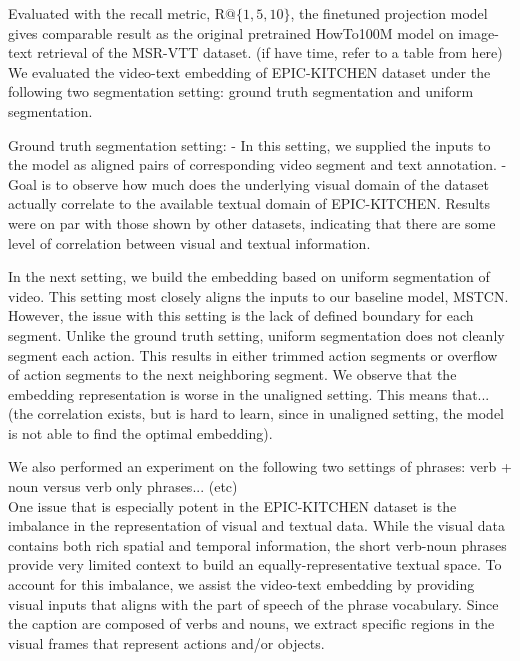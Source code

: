 Evaluated with the recall metric, R$@\{1,5,10\}$, the finetuned projection model gives comparable result as the original pretrained HowTo100M model on image-text retrieval of the MSR-VTT dataset. (if have time, refer to a table from here)\\

We evaluated the video-text embedding of EPIC-KITCHEN dataset under the following two segmentation setting: ground truth segmentation and uniform segmentation. 

Ground truth segmentation setting:
- In this setting, we supplied the inputs to the model as aligned pairs of corresponding video segment and text annotation.
- Goal is to observe how much does the underlying visual domain of the dataset actually correlate to the available textual domain of EPIC-KITCHEN. Results were on par with those shown by other datasets, indicating that there are some level of correlation between visual and textual information. 

In the next setting, we build the embedding based on uniform segmentation of video. This setting most closely aligns the inputs to our baseline model, MSTCN. However, the issue with this setting is the lack of defined boundary for each segment. Unlike the ground truth setting, uniform segmentation does not cleanly segment each action. This results in either trimmed action segments or overflow of action segments to the next neighboring segment. We observe that the embedding representation is worse in the unaligned setting. This means that... (the correlation exists, but is hard to learn, since in unaligned setting, the model is not able to find the optimal embedding).

We also performed an experiment on the following two settings of phrases: verb + noun versus verb only phrases... (etc)\\

One issue that is especially potent in the EPIC-KITCHEN dataset is the imbalance in the representation of visual and textual data. While the visual data contains both rich spatial and temporal information, the short verb-noun phrases provide very limited context to build an equally-representative textual space. To account for this imbalance, we assist the video-text embedding by providing visual inputs that aligns with the part of speech of the phrase vocabulary. Since the caption are composed of verbs and nouns, we extract specific regions in the visual frames that represent actions and/or objects.\\

